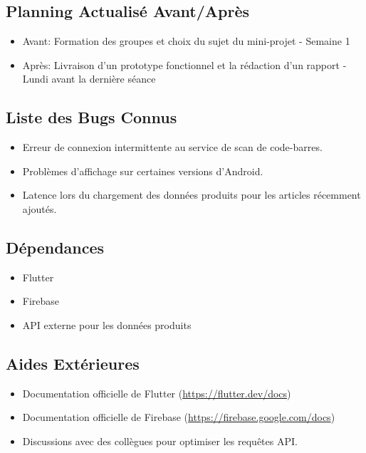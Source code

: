 \subsection{Planning Actualisé Avant/Après}

\begin{itemize}
    \item Avant: Formation des groupes et choix du sujet du mini-projet - Semaine 1
    \item Après: Livraison d’un prototype fonctionnel et la rédaction d’un rapport - Lundi avant la dernière séance
\end{itemize}

\subsection{Liste des Bugs Connus}

\begin{itemize}
    \item Erreur de connexion intermittente au service de scan de code-barres.
    \item Problèmes d'affichage sur certaines versions d'Android.
    \item Latence lors du chargement des données produits pour les articles récemment ajoutés.
\end{itemize}

\subsection{Dépendances}

\begin{itemize}
    \item Flutter
    \item Firebase
    \item API externe pour les données produits
\end{itemize}

\subsection{Aides Extérieures}

\begin{itemize}
    \item Documentation officielle de Flutter (\url{https://flutter.dev/docs})
    \item Documentation officielle de Firebase (\url{https://firebase.google.com/docs})
    \item Discussions avec des collègues pour optimiser les requêtes API.
\end{itemize}